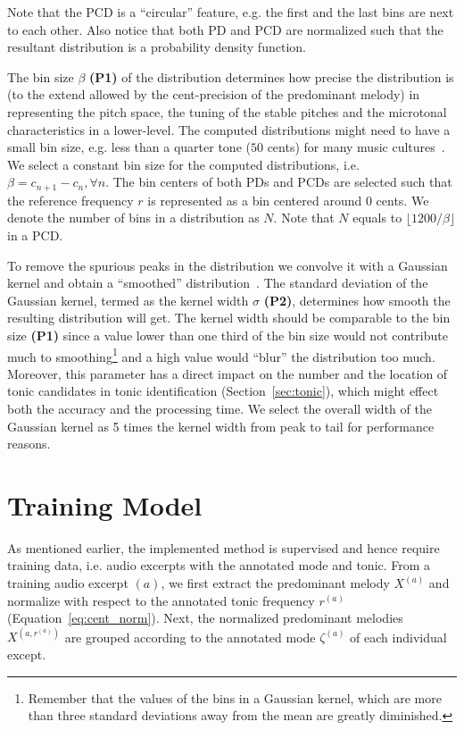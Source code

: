 \documentclass{sig-alternate}
\begin{document}
Note that the PCD is a ``circular'' feature, e.g. the first and the last bins are next to each other. Also notice that both PD and PCD are normalized such that the resultant distribution is a probability density function. 

The bin size $\beta$ {\bf (P1)} of the distribution determines how precise the distribution is (to the extend allowed by the cent-precision of the predominant melody) in representing the pitch space, the tuning of the stable pitches and the microtonal characteristics in a lower-level. The computed distributions might need to have a small bin size, e.g. less than a quarter tone ($50$ cents) for many music cultures~\cite{bozkurt_makam, chordia}. We select a constant bin size for the computed distributions, i.e. $\beta = c_{n+1} - c_{n},  \forall n$. The bin centers of both PDs and PCDs are selected such that the reference frequency $r$ is represented as a bin centered around $0$ cents. We denote the number of bins in a distribution as $N$. Note that $N$ equals to $\lfloor1200 / \beta\rfloor$ in a PCD.

To remove the spurious peaks in the distribution we convolve it with a Gaussian kernel and obtain a ``smoothed'' distribution~\cite{chordia}. The standard deviation of the Gaussian kernel, termed as the kernel width $\sigma$ {\bf (P2)}, determines how smooth the resulting distribution will get. The kernel width should be comparable to the bin size {\bf (P1)} since a value lower than one third of the bin size would not contribute much to smoothing\footnote{Remember that the values of the bins in a Gaussian kernel, which are more than three standard deviations away from the mean are greatly diminished.} and a high value would ``blur''  the distribution too much. Moreover, this parameter has a direct impact on the number and the location of tonic candidates in tonic identification (Section~\ref{sec:tonic}), which might effect both the accuracy and the processing time. We select the overall width of the Gaussian kernel as 5 times the kernel width from peak to tail for performance reasons.

\section{Training Model}\label{sec:training}
As mentioned earlier, the implemented method is supervised and hence require training data, i.e. audio excerpts with the annotated mode and tonic. From a training audio excerpt $(a)$, we first extract the predominant me\-lody $X^{(a)}$ and normalize with respect to the annotated tonic frequency $r^{(a)}$ (Equation~\ref{eq:cent_norm}). Next, the normalized predominant melo\-dies $X^{\left(a, r^{(a)}\right)}$ are grouped according to the annotated mode $\zeta^{(a)}$ of each individual except. 
\end{document}
